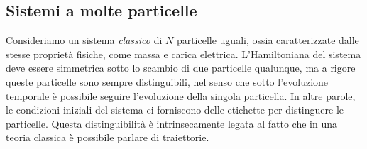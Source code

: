 \documentclass[a4paper, 11pt]{article}
\begin{document}
\subsection{Sistemi a molte particelle}
Consideriamo un sistema \emph{classico} di $N$ particelle uguali, ossia caratterizzate dalle stesse proprietà fisiche, come massa e carica elettrica. L'Hamiltoniana del sistema deve essere simmetrica sotto lo scambio di due particelle qualunque, ma a rigore queste particelle sono sempre distinguibili, nel senso che sotto l'evoluzione temporale è possibile seguire l'evoluzione della singola particella. In altre parole, le condizioni iniziali del sistema ci forniscono delle etichette per distinguere le particelle. Questa distinguibilità è intrinsecamente legata al fatto che in una teoria classica è possibile parlare di traiettorie.
\end{document}
